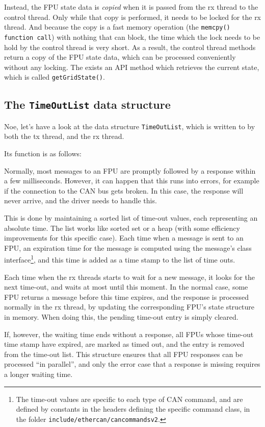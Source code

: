 \documentclass[fontsize=12,a4paper]{scrartcl}
\begin{document}
Instead, the FPU state data is \emph{copied} when it is passed from
the rx thread to the control thread. Only while that copy is
performed, it needs to be locked for the rx thread. And because the
copy is a fast memory operation (the \texttt{memcpy() function call})
with nothing that can block, the time which the lock needs to be hold
by the control thread is very short. As a result, the control thread
methods return a copy of the FPU state data, which can be processed
conveniently without any locking. The exists an API method which
retrieves the current state, which is called \texttt{getGridState()}.

\subsection{The \texttt{TimeOutList} data structure}

Noe, let's have a look at the data structure \texttt{TimeOutList},
which is written to by both the tx thread, and the rx thread.  

Its function is as follows:

Normally, most messages to an FPU are promptly followed by a response
within a few milliseconds. However, it can happen that this runs into
errors, for example if the connection to the CAN bus gets broken. In
this case, the response will never arrive, and the driver needs to
handle this.

This is done by maintaining a sorted list of time-out values, each
representing an absolute time. The list works like sorted set or a
heap (with some efficiency improvements for this specific case). Each
time when a message is sent to an FPU, an expiration time for the
message is computed using the message's class interface\footnote{The
  time-out values are specific to each type of CAN command, and are
  defined by constants in the headers defining the specific command
  class, in the folder \texttt{include/ethercan/cancommandsv2}.}, and
this time is added as a time stamp to the list of time outs.

Each time when the rx threads starts to wait for a new message, it
looks for the next time-out, and waits at most until this moment.  In
the normal case, some FPU returns a message before this time expires,
and the response is processed normally in the rx thread, by updating
the corresponding FPU's state structure in memory. When doing this,
the pending time-out entry is simply cleared.

If, however, the waiting time ends without a response, all FPUs whose
time-out time stamp have expired, are marked as timed out, and the
entry is removed from the time-out list.  This structure ensures that
all FPU responses can be processed ``in parallel'', and only the error
case that a response is missing requires a longer waiting time.
\end{document}
